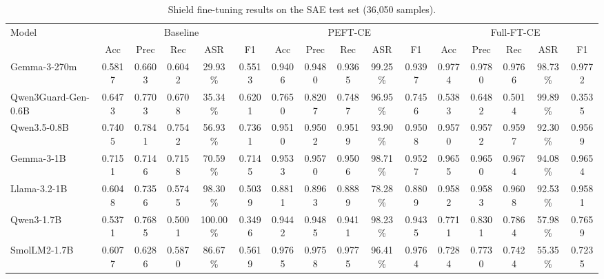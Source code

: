 \begin{table}[t]
\centering
\small
\begin{tabular}{lccccccccccccccc}
\toprule
Model & \multicolumn{5}{c}{Baseline} & \multicolumn{5}{c}{PEFT-CE} & \multicolumn{5}{c}{Full-FT-CE} \\
 & Acc & Prec & Rec & ASR & F1 & Acc & Prec & Rec & ASR & F1 & Acc & Prec & Rec & ASR & F1 \\
\midrule
Gemma-3-270m & 0.5817 & 0.6603 & 0.6042 & 29.93\% & 0.5513 & 0.9406 & 0.9480 & 0.9365 & 99.25\% & 0.9397 & 0.9774 & 0.9780 & 0.9766 & 98.73\% & 0.9772 \\
Qwen3Guard-Gen-0.6B & 0.6473 & 0.7703 & 0.6708 & 35.34\% & 0.6201 & 0.7650 & 0.8207 & 0.7487 & 96.95\% & 0.7456 & 0.5383 & 0.6482 & 0.5014 & 99.89\% & 0.3535 \\
Qwen3.5-0.8B & 0.7405 & 0.7841 & 0.7542 & 56.93\% & 0.7361 & 0.9510 & 0.9502 & 0.9519 & 93.90\% & 0.9508 & 0.9570 & 0.9572 & 0.9597 & 92.30\% & 0.9569 \\
Gemma-3-1B & 0.7151 & 0.7146 & 0.7158 & 70.59\% & 0.7145 & 0.9533 & 0.9570 & 0.9506 & 98.71\% & 0.9527 & 0.9655 & 0.9650 & 0.9674 & 94.08\% & 0.9654 \\
Llama-3.2-1B & 0.6048 & 0.7356 & 0.5745 & 98.30\% & 0.5039 & 0.8811 & 0.8963 & 0.8889 & 78.28\% & 0.8809 & 0.9582 & 0.9583 & 0.9608 & 92.53\% & 0.9581 \\
Qwen3-1.7B & 0.5371 & 0.7685 & 0.5001 & 100.00\% & 0.3496 & 0.9442 & 0.9485 & 0.9411 & 98.23\% & 0.9435 & 0.7711 & 0.8301 & 0.7864 & 57.98\% & 0.7659 \\
SmolLM2-1.7B & 0.6077 & 0.6286 & 0.5870 & 86.67\% & 0.5619 & 0.9765 & 0.9758 & 0.9775 & 96.41\% & 0.9764 & 0.7284 & 0.7730 & 0.7424 & 55.35\% & 0.7235 \\
\bottomrule
\end{tabular}
\caption{Shield fine-tuning results on the SAE test set (36{,}050 samples).}
\label{tab:shield_sae}
\end{table}